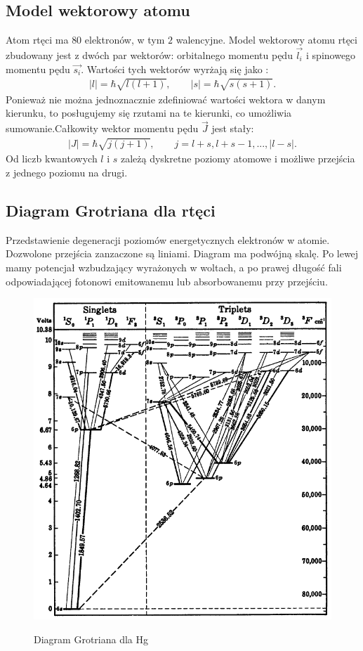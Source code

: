 \documentclass[paper=a4, fontsize=12pt]{scrartcl}
\begin{document}
\subsection{Model wektorowy atomu}
Atom rtęci ma $80$ elektronów, w tym $2$ walencyjne. Model wektorowy atomu rtęci zbudowany jest z dwóch par wektorów: orbitalnego momentu pędu $\vec{l_i}$ i spinowego momentu pędu $\vec{s_i}$. Wartości tych wektorów wyrżają się jako :\begin{align*}
|l|=\hbar \sqrt{l(l+1)}, \qquad |s|=\hbar \sqrt{s(s+1)}.
\end{align*}
Ponieważ nie można jednoznacznie zdefiniować wartości wektora w danym kierunku, to posługujemy się rzutami na te kierunki, co umożliwia sumowanie.Całkowity wektor momentu pędu $\vec{J}$ jest stały: \begin{align*}
|J|=\hbar \sqrt{j(j+1)},\qquad j = l+s, l+s-1, ... ,|l-s|.
\end{align*}	
Od liczb kwantowych $l$ i $s$ zależą dyskretne poziomy atomowe i możliwe przejścia z jednego poziomu na drugi. 

\subsection{Diagram Grotriana dla rtęci}
Przedstawienie degeneracji poziomów energetycznych elektronów w atomie. Dozwolone przejścia zanzaczone są liniami. Diagram ma podwójną skalę. Po lewej mamy potencjał wzbudzający wyrażonych w woltach, a po prawej długość fali odpowiadającej fotonowi emitowanemu lub absorbowanemu przy przejściu.
\begin{figure}[h!]
	\begin{center}
	\includegraphics[width=0.65\linewidth]{x.png}\\	\caption{Diagram Grotriana dla Hg}
	\end{center}
\end{figure}
\end{document}
